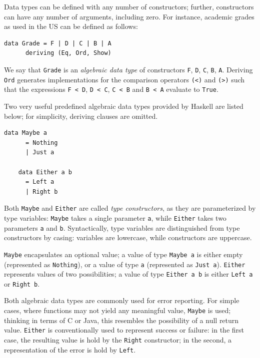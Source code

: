 \documentclass[UdineBachThesis,american,11pt]{PhdThesis}
\begin{document}
  Data types can be defined with any number of constructors; further,
  constructors can have any number of arguments, including zero. For instance,
  academic grades as used in the US can be defined as follows:

  \begin{Verbatim}[gobble=4,fontsize=\small]
    data Grade = F | D | C | B | A
      deriving (Eq, Ord, Show)
  \end{Verbatim}

  We say that \mbox{\texttt{Grade}} is an \emph{algebraic data type} of
  constructors \texttt{F}, \texttt{D}, \texttt{C}, \texttt{B}, \texttt{A}.
  Deriving \mbox{\texttt{Ord}} generates implementations for the comparison
  operators \mbox{\texttt{(<)}} and \mbox{\texttt{(>)}} such that the
  expressions \mbox{\texttt{F < D}}, \mbox{\texttt{D < C}},
  \mbox{\texttt{C < B}} and \mbox{\texttt{B < A}} evaluate to
  \mbox{\texttt{True}}.

  Two very useful predefined algebraic data types provided by Haskell are listed
  below; for simplicity, deriving clauses are omitted.

  \begin{Verbatim}[gobble=4,fontsize=\small]
    data Maybe a
      = Nothing
      | Just a

    data Either a b
      = Left a
      | Right b
  \end{Verbatim}

  Both \mbox{\texttt{Maybe}} and \mbox{\texttt{Either}} are called \emph{type
  constructors}, as they are parameterized by type variables:
  \mbox{\texttt{Maybe}} takes a single parameter \texttt{a}, while
  \mbox{\texttt{Either}} takes two parameters \texttt{a} and \texttt{b}.
  Syntactically, type variables are distinguished from type constructors by
  casing: variables are lowercase, while constructors are uppercase.

  \mbox{\texttt{Maybe}} encapsulates an optional value; a value of type
  \mbox{\texttt{Maybe a}} is either empty (represented as
  \mbox{\texttt{Nothing}}), or a value of type \texttt{a} (represented as
  \mbox{\texttt{Just a}}). \mbox{\texttt{Either}} represents values of two
  possibilities; a value of type \mbox{\texttt{Either a b}} is either
  \mbox{\texttt{Left a}} or \mbox{\texttt{Right b}}.

  \pagebreak

  Both algebraic data types are commonly used for error reporting. For simple
  cases, where functions may not yield any meaningful value,
  \mbox{\texttt{Maybe}} is used; thinking in terms of C or Java, this resembles
  the possibility of a null return value. \mbox{\texttt{Either}} is
  conventionally used to represent success or failure: in the first case, the
  resulting value is hold by the \mbox{\texttt{Right}} constructor; in the
  second, a representation of the error is hold by \mbox{\texttt{Left}}.
\end{document}
